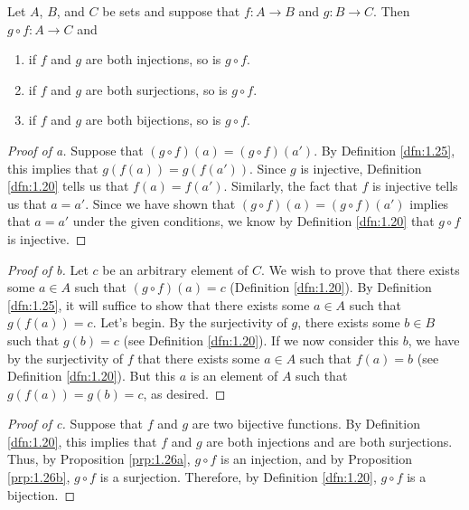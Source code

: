 \documentclass[../main.tex]{subfiles}
\begin{document}
\begin{proposition}\label{prp:1.26}
    Let $A$, $B$, and $C$ be sets and suppose that $f:A\to B$ and $g:B\to C$. Then $g\circ f:A\to C$ and
    \begin{enumerate}[label={\alph*\textup{)}},ref={\theproposition\alph*}]
        \item \label{prp:1.26a}if $f$ and $g$ are both injections, so is $g\circ f$.
        \item \label{prp:1.26b}if $f$ and $g$ are both surjections, so is $g\circ f$.
        \item \label{prp:1.26c}if $f$ and $g$ are both bijections, so is $g\circ f$.
    \end{enumerate}
    \begin{proof}[Proof of a]
        Suppose that $(g\circ f)(a)=(g\circ f)(a')$. By Definition \ref{dfn:1.25}, this implies that $g(f(a))=g(f(a'))$. Since $g$ is injective, Definition \ref{dfn:1.20} tells us that $f(a)=f(a')$. Similarly, the fact that $f$ is injective tells us that $a=a'$. Since we have shown that $(g\circ f)(a)=(g\circ f)(a')$ implies that $a=a'$ under the given conditions, we know by Definition \ref{dfn:1.20} that $g\circ f$ is injective.
    \end{proof}
    \begin{proof}[Proof of b]
        Let $c$ be an arbitrary element of $C$. We wish to prove that there exists some $a\in A$ such that $(g\circ f)(a)=c$ (Definition \ref{dfn:1.20}). By Definition \ref{dfn:1.25}, it will suffice to show that there exists some $a\in A$ such that $g(f(a))=c$. Let's begin. By the surjectivity of $g$, there exists some $b\in B$ such that $g(b)=c$ (see Definition \ref{dfn:1.20}). If we now consider this $b$, we have by the surjectivity of $f$ that there exists some $a\in A$ such that $f(a)=b$ (see Definition \ref{dfn:1.20}). But this $a$ is an element of $A$ such that $g(f(a))=g(b)=c$, as desired.
    \end{proof}
    \begin{proof}[Proof of c]
        Suppose that $f$ and $g$ are two bijective functions. By Definition \ref{dfn:1.20}, this implies that $f$ and $g$ are both injections and are both surjections. Thus, by Proposition \ref{prp:1.26a}, $g\circ f$ is an injection, and by Proposition \ref{prp:1.26b}, $g\circ f$ is a surjection. Therefore, by Definition \ref{dfn:1.20}, $g\circ f$ is a bijection.
    \end{proof}
\end{proposition}
\end{document}
